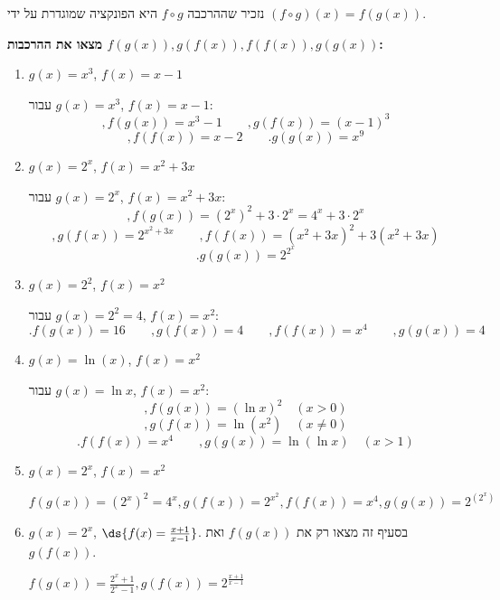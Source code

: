 נזכיר שההרכבה $f\circ g$ היא הפונקציה שמוגדרת על ידי
$(f\circ g)(x)=f(g(x))$.

\textbf{מצאו את ההרכבות
$f(g(x)),g(f(x)),f(f(x)),g(g(x))$:}
\begin{enumerate}
 \item $g(x)=x^3$, $f(x)=x-1$
\begin{solbox}
עבור $g(x)=x^3$, $f(x)=x-1$:
\[
,f(g(x))=x^3-1
\qquad
 ,g(f(x))=(x-1)^3
\]
\[
,f(f(x))=x-2
\qquad
 .g(g(x))=x^9
\]
\end{solbox}
 \item $g(x)=2^x$, $f(x)=x^2+3x$
\begin{solbox}
עבור $g(x)=2^x$, $f(x)=x^2+3x$:
\[
,f(g(x))=(2^x)^2+3\cdot2^x=4^x+3\cdot2^x
\]
\[
,g(f(x))=2^{x^2+3x}
\qquad
 ,f(f(x))=(x^2+3x)^2+3(x^2+3x)
\]
\[
.g(g(x))=2^{2^x}
\]
\end{solbox}

 \item $g(x)=2^2$, $f(x)=x^2$
\begin{solbox}
עבור $g(x)=2^2=4$, $f(x)=x^2$:
\[
.f(g(x))=16
\qquad
 ,g(f(x))=4
\qquad
 ,f(f(x))=x^4
\qquad
 ,g(g(x))=4
\]
\end{solbox}
 \item $g(x)=\ln(x)$, $f(x)=x^2$
\begin{solbox}
עבור $g(x)=\ln x$, $f(x)=x^2$:
\[
,f(g(x))=(\ln x)^2\quad (x>0)
\]
\[
,g(f(x))=\ln(x^2)\quad (x\neq0)
\]
\[
.f(f(x))=x^4
\qquad
 ,g(g(x))=\ln(\ln x)\quad (x>1)
\]
\end{solbox}
\item $g(x)=2^x$, $f(x)=x^2$
\begin{solbox}
$f(g(x))=(2^x)^2=4^x, g(f(x))=2^{x^2},f(f(x))=x^4,g(g(x))=2^{(2^x)}$
\end{solbox}
\item $g(x)=2^x$, $\ds{f(x)=\frac{x+1}{x-1}}$.
בסעיף זה מצאו רק את $f(g(x))$ ואת $g(f(x))$.
\begin{solbox}
$f(g(x))=\frac{2^x+1}{2^x-1} , g(f(x))=2^{\frac{x+1}{x-1}}$
\end{solbox}
\eMs
\end{enumerate}
